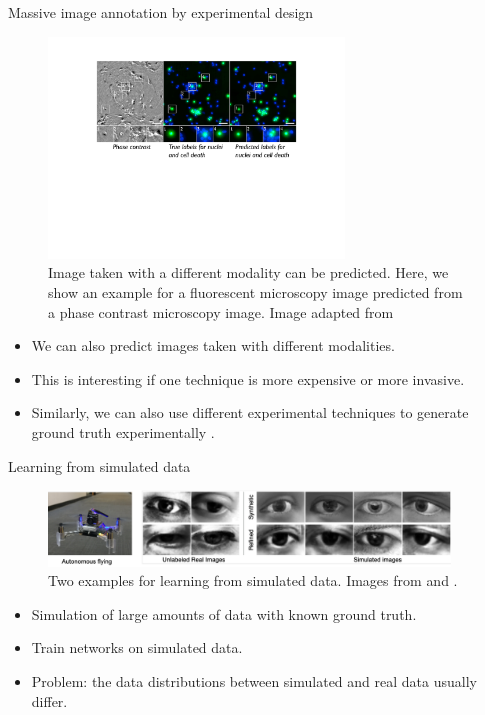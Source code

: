 \documentclass[xcolor=pdftex,dvipsnames,table]{beamer}
\begin{document}
\begin{frame}{Massive image annotation by experimental design}
\begin{figure}[htb]
   \centering
   \includegraphics[width=0.7\textwidth]{../graphics/in_silico_labeling.pdf}
   \caption{Image taken with a different modality can be predicted. Here, we show an example for a fluorescent microscopy image predicted from a phase contrast microscopy image. Image adapted from \cite{Christiansen2018}}
\end{figure}
\begin{itemize}
   \item We can also predict images taken with different modalities. 
   \item This is interesting if one technique is more expensive or more invasive.
   \item Similarly, we can also use different experimental techniques to generate ground truth experimentally \cite{Boyd2020}. 
\end{itemize}
\end{frame}


\begin{frame}{Learning from simulated data}
\begin{figure}[htb]
   \centering
   \includegraphics[width=0.95\textwidth]{../graphics/simulation_example.pdf}
   \caption{Two examples for learning from simulated data. Images from \cite{Kang2019} and \cite{Shrivastava2017}.}
\end{figure}
\begin{itemize}
   \item Simulation of large amounts of data with known ground truth. 
   \item Train networks on simulated data.
   \item Problem: the data distributions between simulated and real data usually differ. 
\end{itemize}
\end{frame}
\end{document}
